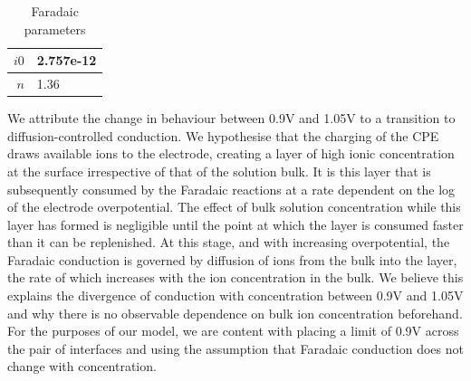 \documentclass[journal, a4paper]{IEEEtran}
\begin{document}
{%

\begin{table}
    \begin{center}
        \begin{tabular}{|r|l|}
            \hline
            $i0$ & 2.757e-12\\ \hline
            $n$ & 1.36\\ \hline
        \end{tabular}
    \end{center}
    \caption{Faradaic parameters}
    \label{tab:FaradaicParams}
\end{table}


We attribute the change in behaviour between 0.9\thinspace V and 1.05\thinspace V to a transition to diffusion-controlled conduction.
We hypothesise that the charging of the CPE draws available ions to the electrode, creating a layer of high ionic concentration at the surface irrespective of that of the solution bulk. It is this layer that is subsequently consumed by the Faradaic reactions at a rate dependent on the log of the electrode overpotential.  The effect of bulk solution concentration while this layer has formed is negligible until the point at which the layer is consumed faster than it can be replenished. At this stage, and with increasing overpotential, the Faradaic conduction is governed by diffusion of ions from the bulk into the layer, the rate of which increases with the ion concentration in the bulk. We believe this explains the divergence of conduction with concentration between 0.9\thinspace V and 1.05\thinspace V and why there is no observable dependence on bulk ion concentration beforehand.
For the purposes of our model, we are content with placing a limit of 0.9\thinspace V across the pair of interfaces and using the assumption that Faradaic conduction does not change with concentration. 

}
\end{document}
